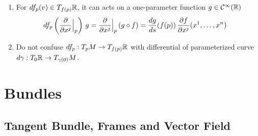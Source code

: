 \documentclass[11pt]{article}
\begin{document}
\begin{itemize}
\begin{remark}
\begin{enumerate}
\item For $df_p(v) \in T_{f(p)}{\mathbb R}$, it can acts on a one-parameter function $g \in {\mathcal C}^{\infty}({\mathbb R})$ 
\begin{align*}
df_p\left(\frac{\partial }{ \partial x^{j}}\Bigr|_{p}\right)\,g &= \frac{\partial }{ \partial x^{j}}\Bigr|_{p}\left(g \circ f\right) = \frac{dg}{ds}(f(p))\, \frac{\partial f}{ \partial x^{j}}(x^1, \ldots, x^n)
\end{align*}

\item Do not confuse $df_p: T_{p}M \rightarrow T_{f(p)}{\mathbb R}$ with differential of parameterized curve $d\gamma: T_{0}{\mathbb R} \rightarrow T_{\gamma(0)}M$.
\end{enumerate}
\end{remark}
\end{itemize}

\section{Bundles}
\subsection{Tangent Bundle, Frames and Vector Field}
\end{document}
